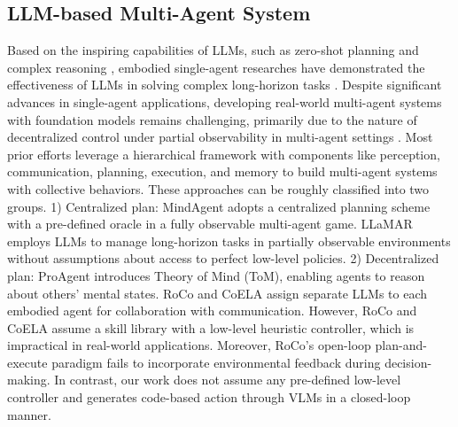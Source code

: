 \subsection{LLM-based Multi-Agent System}
Based on the inspiring capabilities of LLMs, such as zero-shot planning and complex reasoning \cite{10.5555/3600270.3601883,10.5555/3666122.3667509,10.5555/3600270.3602070,Besta_Blach_Kubicek_Gerstenberger_Podstawski_Gianinazzi_Gajda_Lehmann_Niewiadomski_Nyczyk_Hoefler_2024}, embodied single-agent researches have demonstrated the effectiveness of LLMs in solving complex long-horizon tasks \cite{wang2024voyager,yao2023react,NEURIPS2023_1b44b878,ichter2022do,ma2024largelanguagemodelsplay,wang2024executablecodeactionselicit,tan2024cradleempoweringfoundationagents}. 
Despite significant advances in single-agent applications, developing real-world multi-agent systems with foundation models remains challenging, primarily due to the nature of decentralized control under partial observability in multi-agent settings \cite{10.5555/2283396.2283451}. 
Most prior efforts \cite{10610855,zhang2024buildingcooperativeembodiedagents,10.1609/aaai.v38i16.29710,nayak2025llamarlonghorizonplanningmultiagent,gong-etal-2024-mindagent} leverage a hierarchical framework with components like perception, communication, planning, execution, and memory to build multi-agent systems with collective behaviors. These approaches can be roughly classified into two groups. 1) Centralized plan: MindAgent \cite{gong-etal-2024-mindagent} adopts a centralized planning scheme with a pre-defined oracle in a fully observable multi-agent game. LLaMAR \cite{nayak2025llamarlonghorizonplanningmultiagent} employs LLMs to manage long-horizon tasks in partially observable environments without assumptions about access to perfect low-level policies. 2) Decentralized plan: ProAgent \cite{10.1609/aaai.v38i16.29710} introduces Theory of Mind (ToM), enabling agents to reason about others’ mental states. RoCo \cite{10610855} and CoELA \cite{zhang2024buildingcooperativeembodiedagents} assign separate LLMs to each embodied agent for collaboration with communication. However, RoCo and CoELA assume a skill library with a low-level heuristic controller, which is impractical in real-world applications. Moreover, RoCo's open-loop plan-and-execute paradigm fails to incorporate environmental feedback during decision-making. In contrast, our work does not assume any pre-defined low-level controller and generates code-based action through VLMs in a closed-loop manner.